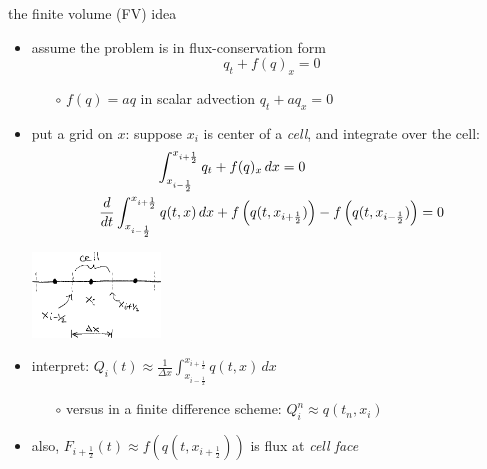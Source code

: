 \documentclass[10pt,hyperref]{beamer}
\newcommand{\xiphalf}{{x_{i+\frac{1}{2}}}}
\newcommand{\ximhalf}{{x_{i-\frac{1}{2}}}}
\newcommand{\Fiphalf}{{F_{i+\frac{1}{2}}}}
\newcommand{\ds}{\displaystyle}
\begin{document}
\begin{frame}{the finite volume (FV) idea}

\begin{itemize}
\item assume the problem is in flux-conservation form
    $$q_t + f(q)_x = 0$$

    \begin{itemize}
    \item[$\circ$] $f(q) = aq$ in scalar advection $q_t + a q_x = 0$
    \end{itemize}
\item put a grid on $x$: suppose $x_i$ is center of a \emph{cell}, and integrate over the cell:
\begin{gather*}
\int_\ximhalf^\xiphalf q_t + f(q)_x \,dx = 0 \hspace{20mm}  \\
\frac{d}{dt} \int_\ximhalf^\xiphalf q(t,x) \,dx + f\left(q(t,\xiphalf)\right) - f\left(q(t,\ximhalf)\right) = 0
\end{gather*}

\vspace{-4mm}
\hfill \includegraphics[width=0.27\textwidth]{figs/fvsketch}

\vspace{-20mm}
\item interpret: $\ds Q_i(t) \approx \frac{1}{\Delta x} \int_\ximhalf^\xiphalf q(t,x)\,dx$
    \begin{itemize}
    \item[$\circ$] versus in a finite difference scheme: $Q_i^n \approx q(t_n,x_i)$
    \end{itemize}
\item also, $\Fiphalf(t) \approx f\left(q(t,\xiphalf)\right)$ is flux at \emph{cell face}
\end{itemize}
\end{frame}
\end{document}
